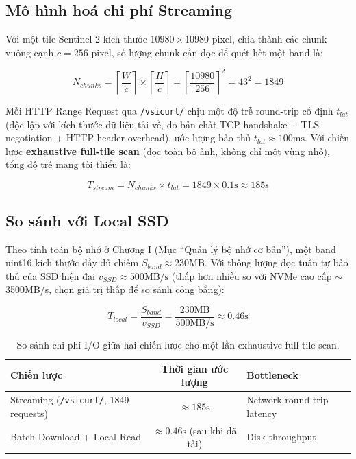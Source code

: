 \documentclass[12pt,a4paper]{report}
\begin{document}
\subsection{Mô hình hoá chi phí Streaming}

Với một tile Sentinel-2 kích thước $10980 \times 10980$ pixel, chia thành các chunk vuông cạnh $c = 256$ pixel, số lượng chunk cần đọc để quét hết một band là:

\begin{equation}
    N_{chunks} = \left\lceil \frac{W}{c} \right\rceil \times \left\lceil \frac{H}{c} \right\rceil = \left\lceil \frac{10980}{256} \right\rceil^2 = 43^2 = 1849
\end{equation}

Mỗi HTTP Range Request qua \texttt{/vsicurl/} chịu một độ trễ round-trip cố định $t_{lat}$ (độc lập với kích thước dữ liệu tải về, do bản chất TCP handshake + TLS negotiation + HTTP header overhead), ước lượng bảo thủ $t_{lat} \approx 100\text{ms}$. Với chiến lược \textbf{exhaustive full-tile scan} (đọc toàn bộ ảnh, không chỉ một vùng nhỏ), tổng độ trễ mạng tối thiểu là:

\begin{equation}
    T_{stream} = N_{chunks} \times t_{lat} = 1849 \times 0.1\text{s} \approx 185\text{s}
\end{equation}

\subsection{So sánh với Local SSD}

Theo tính toán bộ nhớ ở Chương I (Mục ``Quản lý bộ nhớ cơ bản''), một band uint16 kích thước đầy đủ chiếm $S_{band} \approx 230\text{MB}$. Với thông lượng đọc tuần tự bảo thủ của SSD hiện đại $v_{SSD} \approx 500\text{MB/s}$ (thấp hơn nhiều so với NVMe cao cấp $\sim$3500MB/s, chọn giá trị thấp để so sánh công bằng):

\begin{equation}
    T_{local} = \frac{S_{band}}{v_{SSD}} = \frac{230\text{MB}}{500\text{MB/s}} \approx 0.46\text{s}
\end{equation}

\begin{table}[H]
\centering
\begin{tabularx}{\textwidth}{|X|c|X|}
\hline
\rowcolor{blue!80!black}
{\color{white}\textbf{Chiến lược}} & {\color{white}\textbf{Thời gian ước lượng}} & {\color{white}\textbf{Bottleneck}} \\
\hline
\rowcolor{red!12}
Streaming (\texttt{/vsicurl/}, 1849 requests) & $\approx 185\text{s}$ & Network round-trip latency \\
\hline
\rowcolor{green!12}
Batch Download + Local Read & $\approx 0.46\text{s}$ (sau khi đã tải) & Disk throughput \\
\hline
\end{tabularx}
\caption{So sánh chi phí I/O giữa hai chiến lược cho một lần exhaustive full-tile scan.}
\end{table}
\end{document}
